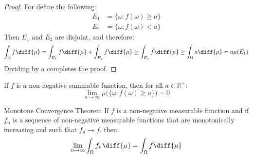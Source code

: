             \begin{proof}
                For define the following:
                \begin{align}
                    E_{1}&=\{\omega:f(\omega)\geq{a}\}\\
                    E_{2}&=\{\omega:f(\omega)<a\}
                \end{align}
                Then $E_{1}$ and $E_{2}$ are disjoint, and therefore:
                \begin{equation}
                    \int_{\Omega}f\diff{\mu}=
                    \int_{E_{1}}f\diff{\mu}+
                    \int_{E_{2}}f\diff{\mu}
                    \geq\int_{E_{1}}f\diff{\mu}
                    \geq\int_{\Omega}a\diff{\mu}
                    =a\mu(E_{1})
                \end{equation}
                Dividing by $a$ completes the proof.
            \end{proof}
            \begin{theorem}
                If $f$ is a non-negative summable function, then
                for all $a\in\mathbb{R}^{+}$:
                \begin{equation}
                    \underset{a\rightarrow\infty}{\lim}
                    \mu\Big(\{\omega:f(\omega)\geq{a}\}\Big)=0
                \end{equation}
            \end{theorem}
            \begin{ltheorem}{Monotone Convergence Theorem}
                If $f$ is a non-negative measurable function and if
                $f_{n}$ is a sequence of non-negative measurable
                functions that are monotonically increasing and such
                that $f_{n}\rightarrow{f}$, then:
                \begin{equation}
                    \underset{n\rightarrow\infty}{\lim}
                    \int_{\Omega}f_{n}\diff{\mu}
                    =\int_{\Omega}f\diff{\mu}
                \end{equation}
            \end{ltheorem}
